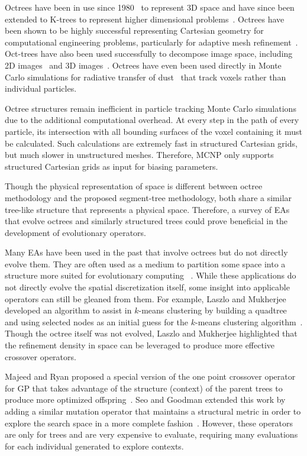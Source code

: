 \documentclass{article}
\begin{document}
Octrees have been in use since 1980~\cite{ref:jackins1980249} to represent 3D space and have since been extended to K-trees to represent higher dimensional problems~\cite{ref:jackins1983533}. Octrees have been shown to be highly successful representing Cartesian geometry for computational engineering problems, particularly for adaptive mesh refinement~\cite{ref:Linden201558}. Oct-trees have also been used successfully to decompose image space, including 2D images~\cite{ref:Lange2004592} and 3D images~\cite{ref:udomchaiporn2013229, ref:Lee2010359}. Octrees have even been used directly in Monte Carlo simulations for radiative transfer of dust~\cite{ref:Saftly2013} that track voxels rather than individual particles.

Octree structures remain inefficient in particle tracking Monte Carlo simulations due to the additional computational overhead. At every step in the path of every particle, its intersection with all bounding surfaces of the voxel containing it must be calculated. Such calculations are extremely fast in structured Cartesian grids, but much slower in unstructured meshes. Therefore, MCNP only supports structured Cartesian grids as input for biasing parameters.

Though the physical representation of space is different between octree methodology and the proposed segment-tree methodology, both share a similar tree-like structure that represents a physical space. Therefore, a survey of EAs that evolve octrees and similarly structured trees could prove beneficial in the development of evolutionary operators.

Many EAs have been used in the past that involve octrees but do not directly evolve them. They are often used as a medium to partition some space into a structure more suited for evolutionary computing ~\cite{ref:Zhu2015301, ref:Schwertfeger200853}. While these applications do not directly evolve the spatial discretization itself, some insight into applicable operators can still be gleaned from them. For example, Laszlo and Mukherjee developed an algorithm to assist in $k$-means clustering by building a quadtree and using selected nodes as an initial guess for the $k$-means clustering algorithm~\cite{ref:Laszlo2006}. Though the octree itself was not evolved, Laszlo and Mukherjee highlighted that the refinement density in space can be leveraged to produce more effective crossover operators.

Majeed and Ryan proposed a special version of the one point crossover operator for GP that takes advantage of the structure (context) of the parent trees to produce more optimized offspring~\cite{ref:Majeed2007}. Seo and Goodman extended this work by adding a similar mutation operator that maintains a structural metric in order to explore the search space in a more complete fashion~\cite{ref:seo2009}. However, these operators are only for trees and are very expensive to evaluate, requiring many evaluations for each individual generated to explore contexts.
\end{document}
